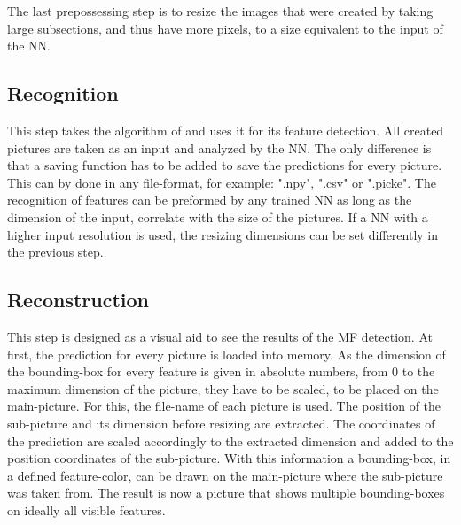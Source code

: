 \documentclass[conference]{IEEEtran}
\begin{document}
The last prepossessing step is to resize the images that were created by taking large subsections, and thus have more pixels, to a size equivalent to the input of the NN. 

\subsection{Recognition}
This step takes the algorithm of \cite{Shi.2021} and uses it for its feature detection. All created pictures are taken as an input and analyzed by the NN. The only difference is that a saving function has to be added to save the predictions for every picture. This can by done in any file-format, for example: ".npy", ".csv" or ".picke". The recognition of features can be preformed by any trained NN as long as the dimension of the input, correlate with the size of the pictures. If a NN with a higher input resolution is used, the resizing dimensions can be set differently in the previous step.
\subsection{Reconstruction}
This step is designed as a visual aid to see the results of the MF detection. At first, the prediction for every picture is loaded into memory. As the dimension of the bounding-box for every feature is given in absolute numbers, from 0 to the maximum dimension of the picture, they have to be scaled, to be placed on the main-picture. For this, the file-name of each picture is used. The position of the sub-picture and its dimension before resizing are extracted. The coordinates of the prediction are scaled accordingly to the extracted dimension and added to the position coordinates of the sub-picture. With this information a bounding-box, in a defined feature-color, can be drawn on the main-picture where the sub-picture was taken from. The result is now a picture that shows multiple bounding-boxes on ideally all visible features. 
\end{document}
